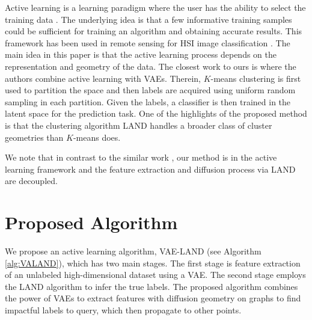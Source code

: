 \documentclass{article}
\begin{document}
Active learning is a learning paradigm where the user has the ability to select the training data \cite{cohn1995active,mackay1992information}.  The underlying idea is that a few informative training samples could be sufficient for training an algorithm and obtaining accurate results. This framework has been used in remote sensing for HSI image classification \cite{liu2016active,wang2017novel,murphy2018iterative,tuia2009active}.  The main idea in this paper is that the active learning process depends on the representation and geometry of the data. The closest work to ours is  \cite{pourkamali2019effectiveness} where the authors combine active learning with VAEs. Therein, $K$-means clustering is first used to partition the space and then labels are acquired using uniform random sampling in each partition. Given the labels, a classifier is then trained in the latent space for the prediction task. One of the highlights of the proposed method is that the clustering algorithm LAND handles a broader class of cluster geometries than $K$-means does. 

We note that in contrast to the similar work \cite{li2020variational}, our method is in the active learning framework and the feature extraction and diffusion process via LAND are decoupled. 

\section{Proposed Algorithm}
\label{sec:ProposedAlgorithm}
We propose an active learning algorithm, VAE-LAND (see Algorithm \ref{alg:VALAND}), which has two main stages. The first stage is feature extraction of an unlabeled high-dimensional dataset using a VAE. The second stage employs the LAND algorithm to infer the true labels.  The proposed algorithm combines the power of VAEs to extract features with diffusion geometry on graphs to find impactful labels to query, which then propagate to other points. 
\end{document}

